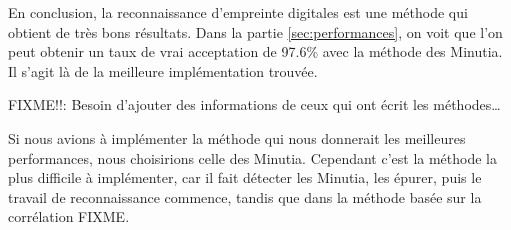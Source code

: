 En conclusion, la reconnaissance d'empreinte digitales est une méthode
qui obtient de très bons résultats. Dans la partie
\ref{sec:performances}, on voit que l'on peut obtenir un taux de vrai
acceptation de 97.6\% avec la méthode des Minutia. Il s'agit là de la
meilleure implémentation trouvée.

FIXME!!: Besoin d'ajouter des informations de ceux qui ont écrit les
méthodes\ldots

Si nous avions à implémenter la méthode qui nous donnerait les
meilleures performances, nous choisirions celle des Minutia. Cependant
c'est la méthode la plus difficile à implémenter, car il fait détecter
les Minutia, les épurer, puis le travail de reconnaissance commence,
tandis que dans la méthode basée sur la corrélation FIXME.



